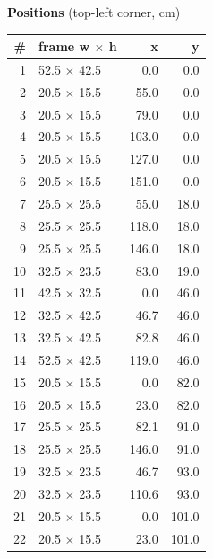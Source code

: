 \documentclass[a4paper,landscape,10pt]{article}
\begin{document}
\begin{minipage}[t]{0.25\textwidth}
\vspace{8pt}
{\bfseries Positions} (top-left corner, cm)\\[2pt]
\tiny
\begin{tabular}{@{}r l r r@{}}
\toprule
\# & frame w $\times$ h & x & y \\
\midrule
1 & 52.5 $\times$ 42.5 & 0.0 & 0.0 \\
2 & 20.5 $\times$ 15.5 & 55.0 & 0.0 \\
3 & 20.5 $\times$ 15.5 & 79.0 & 0.0 \\
4 & 20.5 $\times$ 15.5 & 103.0 & 0.0 \\
5 & 20.5 $\times$ 15.5 & 127.0 & 0.0 \\
6 & 20.5 $\times$ 15.5 & 151.0 & 0.0 \\
7 & 25.5 $\times$ 25.5 & 55.0 & 18.0 \\
8 & 25.5 $\times$ 25.5 & 118.0 & 18.0 \\
9 & 25.5 $\times$ 25.5 & 146.0 & 18.0 \\
10 & 32.5 $\times$ 23.5 & 83.0 & 19.0 \\
11 & 42.5 $\times$ 32.5 & 0.0 & 46.0 \\
12 & 32.5 $\times$ 42.5 & 46.7 & 46.0 \\
13 & 32.5 $\times$ 42.5 & 82.8 & 46.0 \\
14 & 52.5 $\times$ 42.5 & 119.0 & 46.0 \\
15 & 20.5 $\times$ 15.5 & 0.0 & 82.0 \\
16 & 20.5 $\times$ 15.5 & 23.0 & 82.0 \\
17 & 25.5 $\times$ 25.5 & 82.1 & 91.0 \\
18 & 25.5 $\times$ 25.5 & 146.0 & 91.0 \\
19 & 32.5 $\times$ 23.5 & 46.7 & 93.0 \\
20 & 32.5 $\times$ 23.5 & 110.6 & 93.0 \\
21 & 20.5 $\times$ 15.5 & 0.0 & 101.0 \\
22 & 20.5 $\times$ 15.5 & 23.0 & 101.0 \\
\bottomrule
\end{tabular}
\end{minipage}
\clearpage
\end{document}
